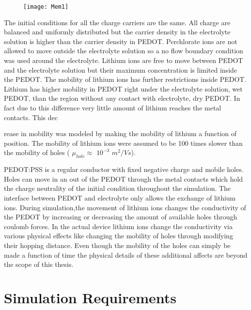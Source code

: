 \begin{figure}[!htp]
\centering
\texttt{[image: Mem1]}
\caption{} 
\label{MemStc}
\end{figure}

The initial conditions for all the charge carriers are the same. All charge are balanced and uniformly distributed but the carrier density in the electrolyte solution is higher than the carrier density in PEDOT. Perchlorate ions are not allowed to move outside the electrolyte solution so a no flow boundary condition was used around the electrolyte. Lithium ions are free to move between PEDOT and the electrolyte solution but their maximum concentration is limited inside the PEDOT. The mobility of lithium ions has further restrictions inside PEDOT. Lithium has higher mobility in PEDOT right under the electrolyte solution, wet PEDOT, than the region without any contact with electrolyte, dry PEDOT. In fact due to this difference very little amount of lithium reaches the metal contacts. This dec{rease in mobility was modeled by making the mobility of lithium a function of position. The mobility of lithium ions were assumed to be 100 times slower than the mobility of holes ( $\mu_{hole} \approx$ $10^{-3}$ $m^2/Vs$).  

PEDOT:PSS is a regular conductor with fixed negative charge and mobile holes. Holes can move in an out of the PEDOT through the metal contacts which hold the charge neutrality of the initial condition throughout the simulation. The interface between PEDOT and electrolyte only allows the exchange of lithium ions. During simulation,the movement of lithium ions changes the conductivity of the PEDOT by increasing or decreasing the amount of available holes through coulomb forces. In the actual device lithium ions change the conductivity via various physical effects like changing the mobility of holes through modifying their hopping distance. Even though the mobility of the holes can simply be made a function of time the physical details of these additional affects are beyond the scope of this thesis. 


\clearpage
\section{Simulation Requirements}

}
